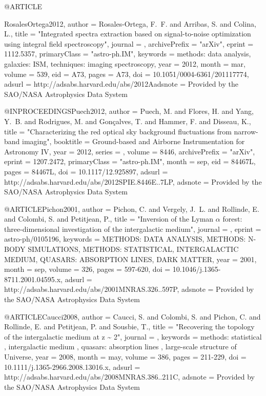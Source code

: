 \documentclass{aa}
\begin{document}
{{@ARTICLE{RosalesOrtega2012,
   author = {{Rosales-Ortega}, F.~F. and {Arribas}, S. and {Colina}, L.},
    title = "{Integrated spectra extraction based on signal-to-noise optimization using integral field spectroscopy}",
  journal = {\aap},
archivePrefix = "arXiv",
   eprint = {1112.5357},
 primaryClass = "astro-ph.IM",
 keywords = {methods: data analysis, galaxies: ISM, techniques: imaging spectroscopy},
     year = 2012,
    month = mar,
   volume = 539,
      eid = {A73},
    pages = {A73},
      doi = {10.1051/0004-6361/201117774},
   adsurl = {http://adsabs.harvard.edu/abs/2012Aadsnote = {Provided by the SAO/NASA Astrophysics Data System}
}

@INPROCEEDINGS{Puech2012,
   author = {{Puech}, M. and {Flores}, H. and {Yang}, Y.~B. and {Rodrigues}, M. and 
	{Gon{\c c}alves}, T. and {Hammer}, F. and {Disseau}, K.},
    title = "{Characterizing the red optical sky background fluctuations from narrow-band imaging}",
booktitle = {Ground-based and Airborne Instrumentation for Astronomy IV},
     year = 2012,
   series = {\procspie},
   volume = 8446,
archivePrefix = "arXiv",
   eprint = {1207.2472},
 primaryClass = "astro-ph.IM",
    month = sep,
      eid = {84467L},
    pages = {84467L},
      doi = {10.1117/12.925897},
   adsurl = {http://adsabs.harvard.edu/abs/2012SPIE.8446E..7LP},
  adsnote = {Provided by the SAO/NASA Astrophysics Data System}
}

@ARTICLE{Pichon2001,
   author = {{Pichon}, C. and {Vergely}, J.~L. and {Rollinde}, E. and {Colombi}, S. and 
	{Petitjean}, P.},
    title = "{Inversion of the Lyman {$\alpha$} forest: three-dimensional investigation of the intergalactic medium}",
  journal = {\mnras},
   eprint = {astro-ph/0105196},
 keywords = {METHODS: DATA ANALYSIS, METHODS: N-BODY SIMULATIONS, METHODS: STATISTICAL, INTERGALACTIC MEDIUM, QUASARS: ABSORPTION LINES, DARK MATTER},
     year = 2001,
    month = sep,
   volume = 326,
    pages = {597-620},
      doi = {10.1046/j.1365-8711.2001.04595.x},
   adsurl = {http://adsabs.harvard.edu/abs/2001MNRAS.326..597P},
  adsnote = {Provided by the SAO/NASA Astrophysics Data System}
}

@ARTICLE{Caucci2008,
   author = {{Caucci}, S. and {Colombi}, S. and {Pichon}, C. and {Rollinde}, E. and 
	{Petitjean}, P. and {Sousbie}, T.},
    title = "{Recovering the topology of the intergalactic medium at z \~{} 2}",
  journal = {\mnras},
 keywords = {methods: statistical , intergalactic medium , quasars: absorption lines , large-scale structure of Universe},
     year = 2008,
    month = may,
   volume = 386,
    pages = {211-229},
      doi = {10.1111/j.1365-2966.2008.13016.x},
   adsurl = {http://adsabs.harvard.edu/abs/2008MNRAS.386..211C},
  adsnote = {Provided by the SAO/NASA Astrophysics Data System}
}

}}}
\end{document}
